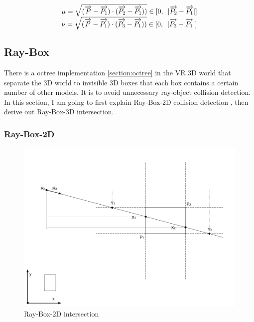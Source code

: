 \[
\begin{array}{lr}
\mu = \sqrt{(\overrightarrow{P} - \overrightarrow{P_1}) \cdot (\overrightarrow{P_2} - \overrightarrow{P_1}))} \in [0,\enspace\lvert \overrightarrow{P_2} - \overrightarrow{P_1} \rvert]\\
\nu = \sqrt{(\overrightarrow{P} - \overrightarrow{P_1}) \cdot (\overrightarrow{P_3} - \overrightarrow{P_1}))} \in [0,\enspace\lvert \overrightarrow{P_3} - \overrightarrow{P_1} \rvert]\\
\end{array}
\]

\subsection{Ray-Box}

There is a octree implementation \ref{section:octree} in the VR 3D world that separate the 3D world to invisible 3D boxes that each box contains a certain number of other models. It is to avoid unnecessary ray-object collision detection. In this section, I am going to first explain Ray-Box-2D collision detection \parencite{Tavian.ray-box-2d.2011}, then derive out Ray-Box-3D intersection.

\subsubsection{Ray-Box-2D}

\begin{figure}[H]
\caption[ray-box-2d-intersection]{Ray-Box-2D intersection}
\label{fig:ray-box-2d}
\centering
\includegraphics[width=\linewidth]{Figures/ray-box-2d-intersection.png}
\decoRule
\end{figure}

